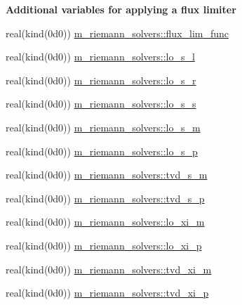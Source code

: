 \begin{Indent}\textbf{ Additional variables for applying a flux limiter}\par
\begin{DoxyCompactItemize}
\item 
real(kind(0d0)) \hyperlink{namespacem__riemann__solvers_a7af64bd01982bc9c8e40b9a662d106c5}{m\+\_\+riemann\+\_\+solvers\+::flux\+\_\+lim\+\_\+func}
\item 
real(kind(0d0)) \hyperlink{namespacem__riemann__solvers_a61bf6c3eebae289a1826c4acd303ae6e}{m\+\_\+riemann\+\_\+solvers\+::lo\+\_\+s\+\_\+l}
\item 
real(kind(0d0)) \hyperlink{namespacem__riemann__solvers_ae880c4216083a3203b42996f2010f080}{m\+\_\+riemann\+\_\+solvers\+::lo\+\_\+s\+\_\+r}
\item 
real(kind(0d0)) \hyperlink{namespacem__riemann__solvers_a28e9af865b5ffd2a8cef04c1004b3aea}{m\+\_\+riemann\+\_\+solvers\+::lo\+\_\+s\+\_\+s}
\item 
real(kind(0d0)) \hyperlink{namespacem__riemann__solvers_af7c9f253cc0584146992cc0b1858e888}{m\+\_\+riemann\+\_\+solvers\+::lo\+\_\+s\+\_\+m}
\item 
real(kind(0d0)) \hyperlink{namespacem__riemann__solvers_a62f6549c30232e14a06efa8dfe7f19a4}{m\+\_\+riemann\+\_\+solvers\+::lo\+\_\+s\+\_\+p}
\item 
real(kind(0d0)) \hyperlink{namespacem__riemann__solvers_a1b9d56d4ae46805db6489e72a09f765b}{m\+\_\+riemann\+\_\+solvers\+::tvd\+\_\+s\+\_\+m}
\item 
real(kind(0d0)) \hyperlink{namespacem__riemann__solvers_aa0a8636a3aef10f1989ce432bd825bf5}{m\+\_\+riemann\+\_\+solvers\+::tvd\+\_\+s\+\_\+p}
\item 
real(kind(0d0)) \hyperlink{namespacem__riemann__solvers_adeb97ac789df26b14a090d09fb8598b7}{m\+\_\+riemann\+\_\+solvers\+::lo\+\_\+xi\+\_\+m}
\item 
real(kind(0d0)) \hyperlink{namespacem__riemann__solvers_aad491932ac39e9c830cb24d395a00c3c}{m\+\_\+riemann\+\_\+solvers\+::lo\+\_\+xi\+\_\+p}
\item 
real(kind(0d0)) \hyperlink{namespacem__riemann__solvers_ad13ea7f1ad55e7119a36ca61bb353ded}{m\+\_\+riemann\+\_\+solvers\+::tvd\+\_\+xi\+\_\+m}
\item 
real(kind(0d0)) \hyperlink{namespacem__riemann__solvers_a5e4f81b0b96e326a19154e0a4b8ae01a}{m\+\_\+riemann\+\_\+solvers\+::tvd\+\_\+xi\+\_\+p}
\end{DoxyCompactItemize}
\end{Indent}
